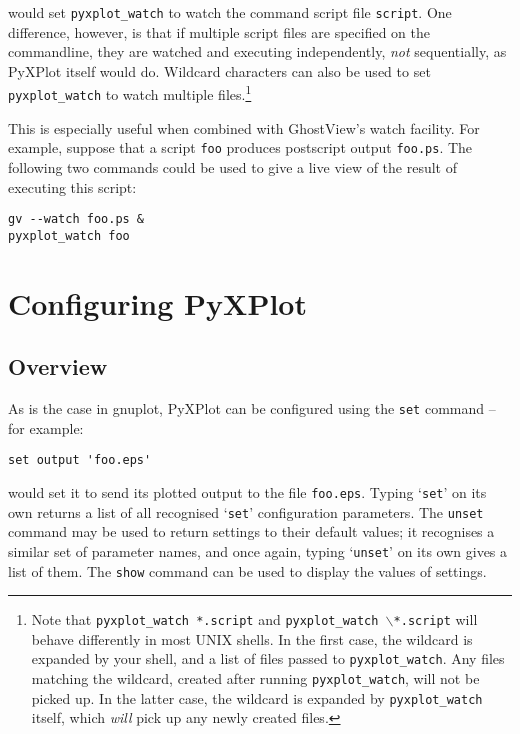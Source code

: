 \documentclass[a4paper,onecolumn,11pt]{book}
\begin{document}
\noindent would set \texttt{pyxplot\_watch} to watch the command script file
\texttt{script}. One difference, however, is that if multiple script files are
specified on the commandline, they are watched and executing independently,
\textit{not} sequentially, as PyXPlot itself would do. Wildcard characters can
also be used to set \texttt{pyxplot\_watch} to watch multiple
files.\footnote{Note that \texttt{pyxplot\_watch *.script} and
\texttt{pyxplot\_watch $\backslash$*.script} will behave differently in most
UNIX shells.  In the first case, the wildcard is expanded by your shell, and a
list of files passed to \texttt{pyxplot\_watch}. Any files matching the
wildcard, created after running \texttt{pyxplot\_watch}, will not be picked up.
In the latter case, the wildcard is expanded by \texttt{pyxplot\_watch} itself,
which \textit{will} pick up any newly created files.}

This is especially useful when combined with GhostView's watch facility. For
example, suppose that a script \texttt{foo} produces postscript output
\texttt{foo.ps}. The following two commands could be used to give a live view
of the result of executing this script:

\begin{verbatim}
gv --watch foo.ps &
pyxplot_watch foo
\end{verbatim}

\chapter{Configuring PyXPlot}

\section{Overview}

\label{configuration}

As is the case in gnuplot, PyXPlot can be configured using the \noindent
\texttt{set} command -- for example:

\begin{verbatim}set output 'foo.eps'\end{verbatim}

\noindent would set it to send its plotted output to the file
\texttt{foo.eps}.  Typing `\texttt{set}' on its own returns a list of all
recognised `\texttt{set}' configuration parameters. The \texttt{unset} command
may be used to return settings to their default values; it recognises a similar
set of parameter names, and once again, typing `\texttt{unset}' on its own
gives a list of them. The \texttt{show} command can be used to display the
values of settings.
\end{document}
